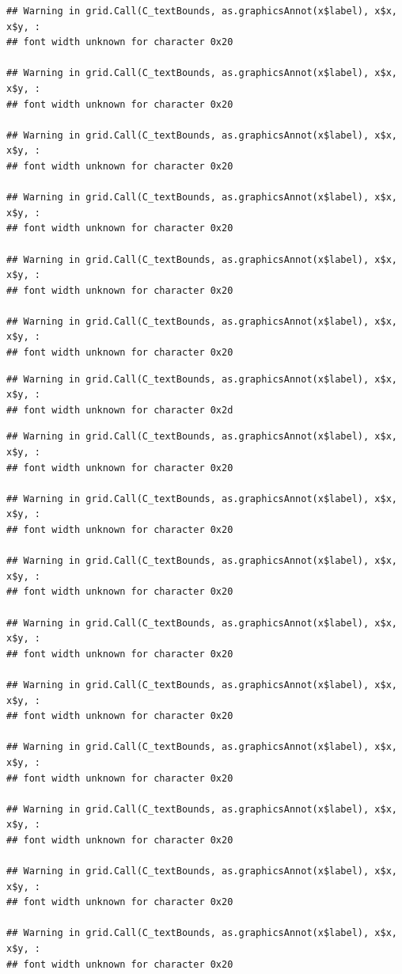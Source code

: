 \documentclass[]{article}
\theoremstyle{definition}
\theoremstyle{definition}
\theoremstyle{definition}
\theoremstyle{remark}
\begin{document}
\begin{verbatim}
## Warning in grid.Call(C_textBounds, as.graphicsAnnot(x$label), x$x, x$y, :
## font width unknown for character 0x20

## Warning in grid.Call(C_textBounds, as.graphicsAnnot(x$label), x$x, x$y, :
## font width unknown for character 0x20

## Warning in grid.Call(C_textBounds, as.graphicsAnnot(x$label), x$x, x$y, :
## font width unknown for character 0x20

## Warning in grid.Call(C_textBounds, as.graphicsAnnot(x$label), x$x, x$y, :
## font width unknown for character 0x20

## Warning in grid.Call(C_textBounds, as.graphicsAnnot(x$label), x$x, x$y, :
## font width unknown for character 0x20

## Warning in grid.Call(C_textBounds, as.graphicsAnnot(x$label), x$x, x$y, :
## font width unknown for character 0x20
\end{verbatim}

\begin{verbatim}
## Warning in grid.Call(C_textBounds, as.graphicsAnnot(x$label), x$x, x$y, :
## font width unknown for character 0x2d
\end{verbatim}

\begin{verbatim}
## Warning in grid.Call(C_textBounds, as.graphicsAnnot(x$label), x$x, x$y, :
## font width unknown for character 0x20

## Warning in grid.Call(C_textBounds, as.graphicsAnnot(x$label), x$x, x$y, :
## font width unknown for character 0x20

## Warning in grid.Call(C_textBounds, as.graphicsAnnot(x$label), x$x, x$y, :
## font width unknown for character 0x20

## Warning in grid.Call(C_textBounds, as.graphicsAnnot(x$label), x$x, x$y, :
## font width unknown for character 0x20

## Warning in grid.Call(C_textBounds, as.graphicsAnnot(x$label), x$x, x$y, :
## font width unknown for character 0x20

## Warning in grid.Call(C_textBounds, as.graphicsAnnot(x$label), x$x, x$y, :
## font width unknown for character 0x20

## Warning in grid.Call(C_textBounds, as.graphicsAnnot(x$label), x$x, x$y, :
## font width unknown for character 0x20

## Warning in grid.Call(C_textBounds, as.graphicsAnnot(x$label), x$x, x$y, :
## font width unknown for character 0x20

## Warning in grid.Call(C_textBounds, as.graphicsAnnot(x$label), x$x, x$y, :
## font width unknown for character 0x20
\end{verbatim}
\end{document}
